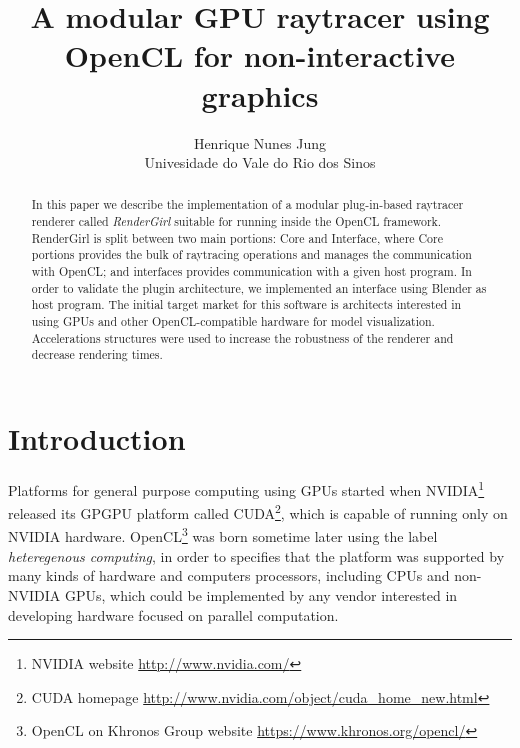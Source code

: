 \documentclass[a4paper]{sbgames}               %
\title{A modular GPU raytracer using OpenCL for non-interactive graphics}
\author{Henrique Nunes Jung\\ Univesidade do Vale do Rio dos Sinos
}
\begin{document}
\teaser{

}


\maketitle


\begin{abstract}

  In this paper we describe the implementation of a modular
  plug-in-based raytracer renderer called \emph{RenderGirl} suitable
  for running inside the OpenCL framework. RenderGirl is split between
  two main portions: Core and Interface, where Core portions provides
  the bulk of raytracing operations and manages the communication with
  OpenCL; and interfaces provides communication with a given
  host program. In order to validate the plugin architecture, we
  implemented an interface using Blender as host program. The initial
  target market for this software is architects interested in using
  GPUs and other OpenCL-compatible hardware for model
  visualization. Accelerations structures were used to increase the
  robustness of the renderer and decrease rendering times.
\end{abstract}

\keywordlist
\contactlist

\section{Introduction}

Platforms for general purpose computing using GPUs started when
NVIDIA\footnote{NVIDIA website \url{http://www.nvidia.com/}} released
its GPGPU platform called CUDA\footnote{CUDA homepage
 \url{http://www.nvidia.com/object/cuda_home_new.html}}, which is
capable of running only on NVIDIA hardware. OpenCL\footnote{OpenCL on
 Khronos Group website \url{https://www.khronos.org/opencl/}} was
born sometime later using the label \emph{heteregenous computing}, in
order to specifies that the platform was supported by many kinds of
hardware and computers processors, including CPUs and non-NVIDIA GPUs,
which could be implemented by any vendor interested in developing
hardware focused on parallel computation.
\end{document}
